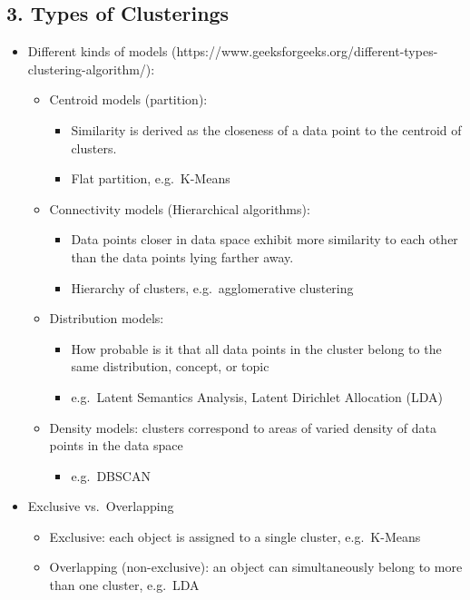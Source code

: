 \documentclass[11pt]{article}
\providecommand{\tightlist}{%
      \setlength{\itemsep}{0pt}\setlength{\parskip}{0pt}}
\begin{document}
    \hypertarget{types-of-clusterings}{%
\subsection{3. Types of Clusterings}\label{types-of-clusterings}}

\begin{itemize}
\tightlist
\item
  Different kinds of models
  (https://www.geeksforgeeks.org/different-types-clustering-algorithm/):

  \begin{itemize}
  \tightlist
  \item
    Centroid models (partition):

    \begin{itemize}
    \tightlist
    \item
      Similarity is derived as the closeness of a data point to the
      centroid of clusters.
    \item
      Flat partition, e.g.~K-Means 
    \end{itemize}
  \item
    Connectivity models (Hierarchical algorithms):

    \begin{itemize}
    \tightlist
    \item
      Data points closer in data space exhibit more similarity to each
      other than the data points lying farther away.\\
    \item
      Hierarchy of clusters, e.g.~agglomerative clustering 
    \end{itemize}
  \item
    Distribution models:

    \begin{itemize}
    \tightlist
    \item
      How probable is it that all data points in the cluster belong to
      the same distribution, concept, or topic
    \item
      e.g.~Latent Semantics Analysis, Latent Dirichlet Allocation (LDA) 
    \end{itemize}
  \item
    Density models: clusters correspond to areas of varied density of
    data points in the data space

    \begin{itemize}
    \tightlist
    \item
      e.g.~DBSCAN 
    \end{itemize}
  \end{itemize}
\item
  Exclusive vs.~Overlapping

  \begin{itemize}
  \tightlist
  \item
    Exclusive: each object is assigned to a single cluster, e.g.~K-Means
  \item
    Overlapping (non-exclusive): an object can simultaneously belong to
    more than one cluster, e.g.~LDA
  \end{itemize}
\end{itemize}
\end{document}

